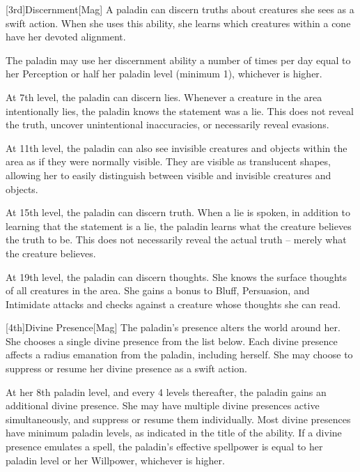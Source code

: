         [3rd]{Discernment}[Mag]
        A paladin can discern truths about creatures she sees as a swift action.
        When she uses this ability, she learns which creatures within a \arealarge cone have her devoted alignment.

        The paladin may use her discernment ability a number of times per day equal to her Perception or half her paladin level (minimum 1), whichever is higher.

        At 7th level, the paladin can discern lies.
        Whenever a creature in the area intentionally lies, the paladin knows the statement was a lie.
        This does not reveal the truth, uncover unintentional inaccuracies, or necessarily reveal evasions.

        At 11th level, the paladin can also see invisible creatures and objects within the area as if they were normally visible.
        They are visible as translucent shapes, allowing her to easily distinguish between visible and invisible creatures and objects.

        At 15th level, the paladin can discern truth.
        When a lie is spoken, in addition to learning that the statement is a lie, the paladin learns what the creature believes the truth to be.
        This does not necessarily reveal the actual truth -- merely what the creature believes.

        At 19th level, the paladin can discern thoughts.
        She knows the surface thoughts of all creatures in the area.
        She gains a  bonus to Bluff, Persuasion, and Intimidate attacks and checks against a creature whose thoughts she can read.

        [4th]{Divine Presence}[Mag]
        The paladin's presence alters the world around her.
        She chooses a single divine presence from the list below.
        Each divine presence affects a \areamed radius emanation from the paladin, including herself.
        She may choose to suppress or resume her divine presence as a swift action.

        At her 8th paladin level, and every 4 levels thereafter, the paladin gains an additional divine presence.
        She may have multiple divine presences active simultaneously, and suppress or resume them individually.
        Most divine presences have minimum paladin levels, as indicated in the title of the ability.
        If a divine presence emulates a spell, the paladin's effective spellpower is equal to her paladin level or her Willpower, whichever is higher.


